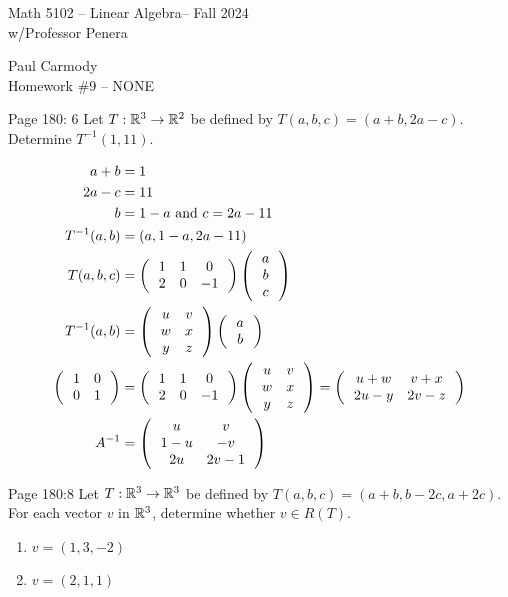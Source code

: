 \documentclass[10pt,a4paper]{report}
\newcommand{\CLASSNAME}{Math 5102 -- Linear Algebra}
\newcommand{\STUDENTNAME}{Paul Carmody}
\newcommand{\ASSIGNMENT}{Homework \#9 }
\newcommand{\DUEDATE}{NONE}
\newcommand{\SEMESTER}{Fall 2024}
\newcommand{\BLUE}[1]{\textcolor{blue}{#1}}
\begin{document}
\begin{center}
	\Large{\CLASSNAME -- \SEMESTER} \\
	\large{ w/Professor Penera}
\end{center}
\begin{center}
	\STUDENTNAME \\
	\ASSIGNMENT -- \DUEDATE\\
\end{center} 

\noindent Page 180: 6  Let $T:\mathbb{R}^3\to \mathbb{R}^2$ be defined by $T(a,b,c)=(a+b,2a-c)$.  Determine $T^{-1}(1,11)$.

\BLUE{\begin{align*}
	a+b &= 1 \\
	2a-c &= 11 \\
	b &= 1-a \text{ and } c = 2a-11 \\
	T^{-1}(a,b) &= (a, 1-a, 2a-11)\\
	T(a,b,c) &= \left (\, \begin{array}{ccc}
		1 & 1 & 0\\
		2 & 0 & -1
	\end{array}
	 \,\right )\left (\, \begin{array}{c}
		a\\b\\c
	\end{array}
	 \,\right )\\
	T^{-1}(a,b) &= \left (\, \begin{array}{cc}
		u & v \\
		w & x \\
		y & z
	\end{array}
	 \,\right )\left (\, \begin{array}{c}
		a\\b
	\end{array}
	 \,\right )\\
	\left (\,  \begin{array}{c c} 1&0 \\ 0 & 1 \end{array}  \,\right ) &= \left (\, \begin{array}{ccc}
		1 & 1 & 0\\
		2 & 0 & -1
	\end{array}
	 \,\right )\left (\, \begin{array}{cc}
		u & v \\
		w & x \\
		y & z
	\end{array}
	 \,\right ) = \left (\, \begin{array}{cc}
		u+w & v+x \\
		2u-y & 2v-z
	\end{array}
	 \,\right ) \\
	A^{-1} &= \left (\, \begin{array}{cc}
		u & v\\
		1-u & -v\\
		2u & 2v-1
	\end{array}
	 \,\right )
\end{align*}
}

\noindent Page 180:8 Let $T:\mathbb{R}^3\to \mathbb{R}^3$ be defined by $T(a,b,c)=(a+b,b-2c,a+2c)$.  For each vector $v$ in $\mathbb{R}^3$, determine whether $v \in R(T)$.
\begin{enumerate}[label=(\alph*)]
	\item $v=(1,3,-2)$
	\item $v = (2,1,1)$
\end{enumerate}
\end{document}
